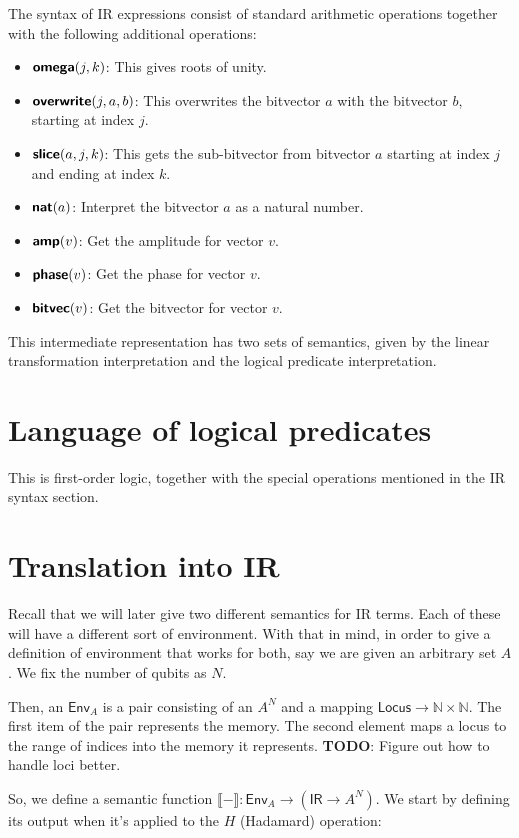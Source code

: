 \documentclass[runningheads]{llncs}
\newcommand {\ra} {\rightarrow}
\newcommand {\Env} {\textsf{Env}}
\newcommand {\Locus} {\textsf{Locus}}
\newcommand {\sem} [1] {\llbracket #1 \rrbracket}
\newcommand {\ir} [1] {\textsf{\textbf{#1}}}
\newcommand {\IRep} {\textsf{IR}}
\newcommand {\irOverwrite} {\ir{overwrite}}
\newcommand {\irSlice} {\ir{slice}}
\newcommand {\irNat} {\ir{nat}}
\newcommand {\irAmp} {\ir{amp}}
\newcommand {\irPhase} {\ir{phase}}
\newcommand {\irBV} {\ir{bitvec}}
\newcommand {\irOmega} {\ir{omega}}
\begin{document}
The syntax of IR expressions consist of standard arithmetic operations together with the following additional operations:

\begin{itemize}
  \item $\irOmega(j, k)$: This gives roots of unity.
  \item $\irOverwrite(j, a, b)$: This overwrites the bitvector $a$ with the bitvector $b$, starting at index $j$.
  \item $\irSlice(a, j, k)$: This gets the sub-bitvector from bitvector $a$ starting at index $j$ and ending at index $k$.
  \item $\irNat(a)$: Interpret the bitvector $a$ as a natural number.
  \item $\irAmp(v)$: Get the amplitude for vector $v$.
  \item $\irPhase(v)$: Get the phase for vector $v$.
  \item $\irBV(v)$: Get the bitvector for vector $v$.
\end{itemize}

This intermediate representation has two sets of semantics, given by the linear transformation interpretation and the logical predicate interpretation.

\section{Language of logical predicates}

This is first-order logic, together with the special operations mentioned in the IR syntax section.

\section{Translation into IR}

Recall that we will later give two different semantics for IR terms. Each of these will have a different sort of environment. With that in mind, in order to give a definition of environment that works for both, say we are given an arbitrary set $A$. We fix the number of qubits as $N$.

Then, an $\Env_A$ is a pair consisting of an $A^N$ and a mapping $\Locus \ra \mathbb{N} \times \mathbb{N}$. The first item of the pair represents the memory. The second element maps a locus to the range of indices into the memory it represents. \textbf{TODO}: Figure out how to handle loci better.

So, we define a semantic function $\sem{-} : \Env_A \ra (\IRep \ra A^N)$. We start by defining its output when it's applied to the $H$ (Hadamard) operation:
\end{document}
